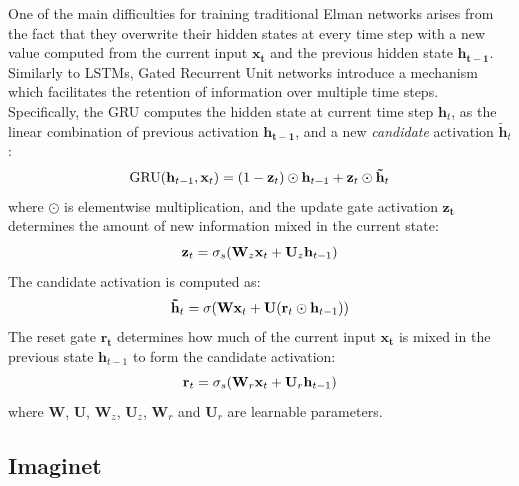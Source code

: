 One of the main difficulties for training traditional Elman networks
arises from the fact that they overwrite their hidden states at every
time step with a new value computed from the current input $\mathbf{x_{t}}$ and
the previous hidden state $\mathbf{h_{t-1}}$. Similarly to LSTMs,
Gated Recurrent Unit networks introduce a mechanism which facilitates the retention of 
information over multiple time steps.
Specifically, the GRU computes the hidden state at current time step $\mathbf{h}_{t}$, as the
linear combination of previous activation $\mathbf{h_{t-1}}$, and a new
{\it candidate} activation $\mathbf{\tilde{h}}_t$:
%
\vspace{-.2cm}
\begin{equation}
  \mathrm{GRU}(\mathbf{h}_{t-1}, \mathbf{x}_t) = (1 - \mathbf{z}_t)\odot \mathbf{h}_{t-1} + \mathbf{z}_t \odot \mathbf{\tilde{h}}_t
\vspace{-.1cm}
\end{equation}
%
where $\odot$ is elementwise multiplication, and the update gate
activation $\mathbf{z_{t}}$ determines the amount of new information
mixed in the current state:
%
\vspace{-.1cm}
\begin{equation}
\label{eq:gru-update}
   \mathbf{z}_t = \sigma_s(\mathbf{W}_z \mathbf{x}_t + \mathbf{U}_z \mathbf{h}_{t-1})
\vspace{-.1cm}
\end{equation}
%
The candidate activation is computed as:
%
\vspace{-.2cm}
\begin{equation}
\label{eq:gru-cand}
   \mathbf{\tilde{h}}_t = \sigma(\mathbf{W} \mathbf{x}_t + \mathbf{U}(\mathbf{r}_t \odot \mathbf{h}_{t-1}))
\vspace{-.1cm}
\end{equation}
%
The reset gate $\mathbf{r_{t}}$ determines how much of the current
input $\mathbf{x_{t}}$ is mixed in the previous state
$\mathbf{h}_{t-1}$ to form the candidate activation:
%
\vspace{-.2cm}
\begin{equation}
\label{eq:gru-reset}
   \mathbf{r}_t = \sigma_s(\mathbf{W}_r \mathbf{x}_t + \mathbf{U}_r \mathbf{h}_{t-1})
\vspace{-.1cm}
\end{equation}
where $\mathbf{W}$, $\mathbf{U}$, $\mathbf{W}_z$, $\mathbf{U}_z$, $\mathbf{W}_r$ and $\mathbf{U}_r$ are learnable parameters.



\subsection{Imaginet}
\label{sec:imaginet}



